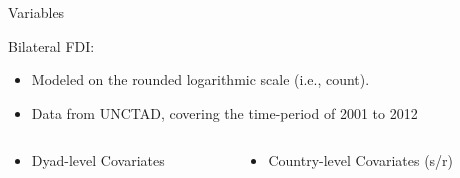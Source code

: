 \documentclass{beamer}
\begin{document}
\begin{frame}{Variables}

Bilateral FDI: 
\begin{itemize}  
\item Modeled on the rounded logarithmic scale (i.e., count). 
\item Data from UNCTAD, covering the time-period of 2001 to 2012
\end{itemize}

\begin{columns}[T]
    \begin{column}{.5\textwidth}
\begin{itemize}
\item{Dyad-level Covariates}
\end{itemize}
    \end{column}
    \begin{column}{.5\textwidth}
\begin{itemize}
\item{Country-level Covariates (s/r)}
\end{itemize}
        \end{column}
  \end{columns}
 




\end{frame}
\end{document}
